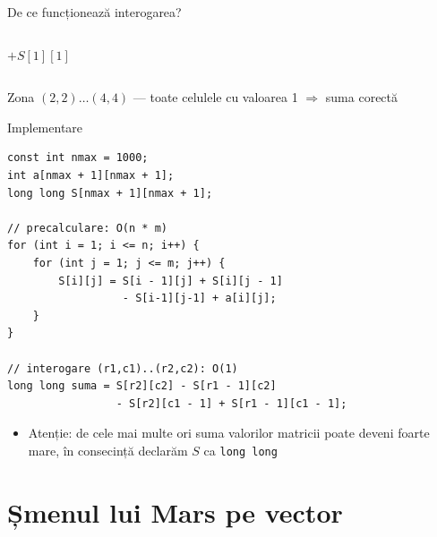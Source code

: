 ﻿\documentclass{beamer}
\begin{document}
\begin{frame}{De ce funcționează interogarea?}
\begin{columns}[c]
    \centering
    {\footnotesize $+S[1][1]$}
    \begin{center}
    \end{center}
  \end{columns}

  \vfill
  \begin{center}
    \small Zona $(2,2)\ldots(4,4)$ — toate celulele cu valoarea 1 $\Rightarrow$ suma corectă \checkmark
  \end{center}
\end{frame}

\begin{frame}{Implementare}
  \begin{lstlisting}
const int nmax = 1000;
int a[nmax + 1][nmax + 1];
long long S[nmax + 1][nmax + 1];

// precalculare: O(n * m)
for (int i = 1; i <= n; i++) {
    for (int j = 1; j <= m; j++) {
        S[i][j] = S[i - 1][j] + S[i][j - 1]
                  - S[i-1][j-1] + a[i][j];
    }
}

// interogare (r1,c1)..(r2,c2): O(1)
long long suma = S[r2][c2] - S[r1 - 1][c2]
                 - S[r2][c1 - 1] + S[r1 - 1][c1 - 1];
  \end{lstlisting}

  \begin{itemize}
    \item \alert{Atenție:} de cele mai multe ori suma valorilor matricii poate deveni foarte mare, în consecință declarăm $S$ ca \texttt{long long}
  \end{itemize}
\end{frame}

\section{Șmenul lui Mars pe vector}
\end{document}
